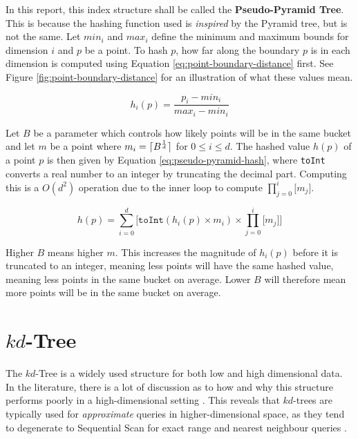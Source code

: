 In this report, this index structure shall be called the \textbf{Pseudo-Pyramid Tree}. This is because the hashing function used is \textit{inspired} by the Pyramid tree, but is not the same. Let $min_i$ and $max_i$ define the minimum and maximum bounds for dimension $i$ and $p$ be a point. To hash $p$, how far along the boundary $p$ is in each dimension is computed using Equation \ref{eq:point-boundary-distance} first. See Figure \ref{fig:point-boundary-distance} for an illustration of what these values mean.

\begin{equation}
	h_i(p) = \frac{p_i - min_i}{max_i - min_i}
	\label{eq:point-boundary-distance}
\end{equation}

Let $B$ be a parameter which controls how likely points will be in the same bucket and let $m$ be a point where $m_i = \lceil B^{\frac{1}{d}}\rceil$ for $0 \leq i \leq d$. The hashed value $h(p)$ of a point $p$ is then given by Equation \ref{eq:pseudo-pyramid-hash},  where \texttt{toInt} converts a real number to an integer by truncating the decimal part. Computing this is a $O(d^2)$ operation due to the inner loop to compute $\prod_{j=0}^{i}{\lbrack m_j \rbrack}$.

\begin{equation}
	h(p) = \sum_{i = 0}^{d} { \lbrack \texttt{toInt}( h_i(p) \times m_i ) \times \prod_{j=0}^{i}{\lbrack m_j \rbrack} \rbrack }
	\label{eq:pseudo-pyramid-hash}
\end{equation}

Higher $B$ means higher $m$. This increases the magnitude of $h_i(p)$ before it is truncated to an integer, meaning less points will have the same hashed value, meaning less points in the same bucket on average. Lower $B$ will therefore mean more points will be in the same bucket on average.

\section{$kd$-Tree}
\label{sec:kd-tree-chosen}

The $kd$-Tree is a widely used structure for both low and high dimensional data. In the literature, there is a lot of discussion as to how and why this structure performs poorly in a high-dimensional setting \cite{highd-nn, search-highd-analysis}. This reveals that $kd$-trees are typically used for \textit{approximate} queries in higher-dimensional space, as they tend to degenerate to Sequential Scan for exact range and nearest neighbour queries \cite{similarity-searching}. 

